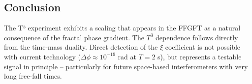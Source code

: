 	\subsection*{Conclusion}
	
	The T³ experiment exhibits a scaling that appears in the FFGFT as a natural consequence of the fractal phase gradient. The \(T^3\) dependence follows directly from the time-mass duality. Direct detection of the \(\xi\) coefficient is not possible with current technology (\(\Delta\phi \approx 10^{-19}\) rad at \(T = 2\) s), but represents a testable signal in principle -- particularly for future space-based interferometers with very long free-fall times.



